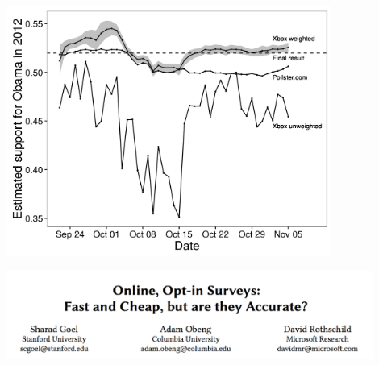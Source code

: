 \documentclass[aspectratio=169]{beamer}
\begin{document}
\begin{frame}

\begin{center}
\includegraphics[width=0.8\textwidth]{figures/bitbybit3-8_wang_forecasting_2015_fig2_and_3}
\end{center}

\end{frame}
\begin{frame}

\begin{center}
\includegraphics[width=0.9\textwidth]{figures/goel_online_2017_title}
\end{center}

\end{frame}
\end{document}
